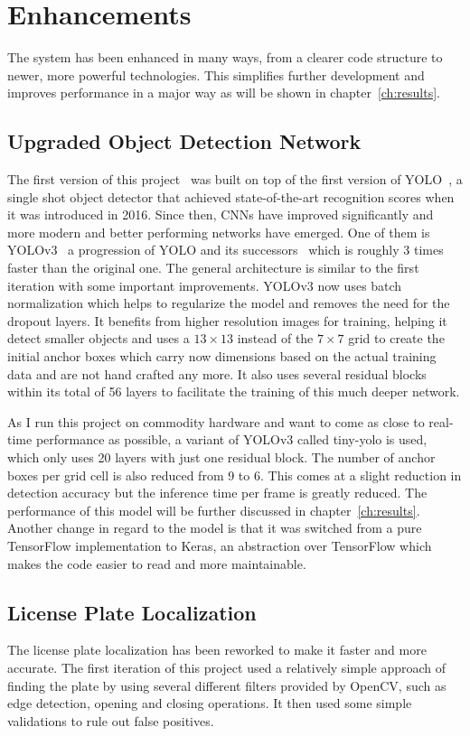 \chapter{Enhancements} \label{ch:enhancements}

The system has been enhanced in many ways, from a clearer code structure to newer, more powerful technologies.
This simplifies further development and improves performance in a major way as will be shown in chapter~\ref{ch:results}.


\section{Upgraded Object Detection Network}
The first version of this project~\cite{Berger2018} was built on top of the first version of YOLO~\cite{Redmon}, a single shot object detector that achieved state-of-the-art recognition scores when it was introduced in 2016.
Since then, CNNs have improved significantly and more modern and better performing networks have emerged.
One of them is YOLOv3~\cite{yolov3} a progression of YOLO and its successors~\cite{Redmon2017} which is roughly 3 times faster than the original one.
The general architecture is similar to the first iteration with some important improvements.
YOLOv3 now uses batch normalization which helps to regularize the model and removes the need for the dropout layers.
It benefits from higher resolution images for training, helping it detect smaller objects and uses a $13 \times 13$ instead of the $7 \times 7$ grid to create the initial anchor boxes which carry now dimensions based on the actual training data and are not hand crafted any more.
It also uses several residual blocks~\cite{He2016} within its total of 56 layers to facilitate the training of this much deeper network.

As I run this project on commodity hardware and want to come as close to real-time performance as possible, a variant of YOLOv3 called tiny-yolo is used, which only uses 20 layers with just one residual block.
The number of anchor boxes per grid cell is also reduced from 9 to 6.
This comes at a slight reduction in detection accuracy but the inference time per frame is greatly reduced.
The performance of this model will be further discussed in chapter~\ref{ch:results}.
Another change in regard to the model is that it was switched from a pure TensorFlow implementation to Keras, an abstraction over TensorFlow which makes the code easier to read and more maintainable.


\section{License Plate Localization}
The license plate localization has been reworked to make it faster and more accurate.
The first iteration of this project used a relatively simple approach of finding the plate by using several different filters provided by OpenCV, such as edge detection, opening and closing operations.
It then used some simple validations to rule out false positives.

